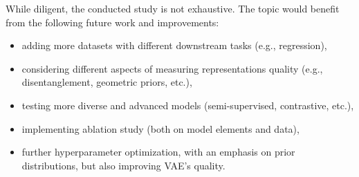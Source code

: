 \vspace{\baselineskip}
While diligent, the conducted study is not exhaustive. The topic would benefit from the following future work and improvements:
\begin{itemize}
    \item adding more datasets with different downstream tasks (e.g., regression),
    \item considering different aspects of measuring representations quality (e.g., disentanglement, geometric priors, etc.),
    \item testing more diverse and advanced models (semi-supervised, contrastive, etc.),
    \item implementing ablation study (both on model elements and data),
    \item further hyperparameter optimization, with an emphasis on prior distributions, but also improving VAE's quality.
\end{itemize}

